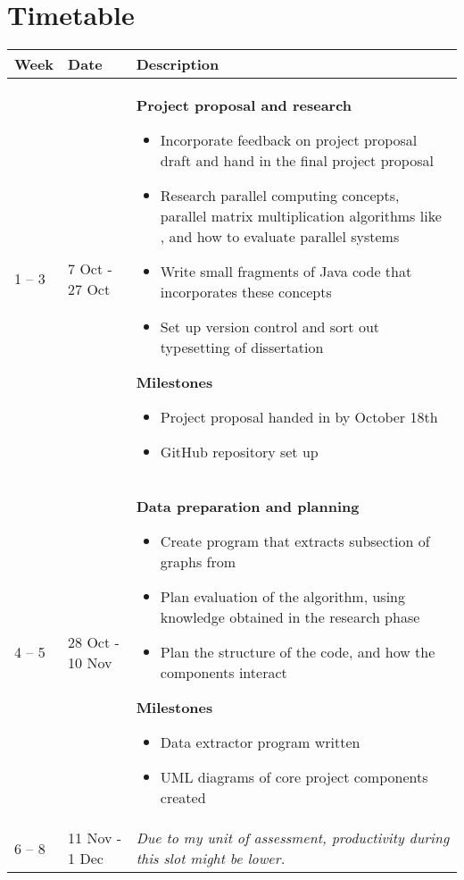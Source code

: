 \documentclass{article}
\begin{document}
\newpage

\section*{Timetable}%
\label{sec:Timetable}

\begin{longtable}{m{40pt}m{75pt}m{265pt}}
    \hline
    \hline
    \textbf{Week} & \textbf{Date} & \textbf{Description} \\
    \hline
    1 -- 3 & 7 Oct - 27 Oct & %
    \textbf{Project proposal and research}
    \begin{itemize}
        \item Incorporate feedback on project proposal draft and hand in the
            final project proposal
        \item Research parallel computing concepts, parallel matrix
            multiplication algorithms like \cite{fox, cannon}, and how to evaluate
            parallel systems
        \item Write small fragments of Java code that incorporates these concepts
        \item Set up version control and sort out typesetting of dissertation
    \end{itemize}
    \textbf{Milestones}
    \begin{itemize}
        \item Project proposal handed in by October 18th
        \item GitHub repository set up
    \end{itemize} \\
    \hline
    4 -- 5 & 28 Oct - 10 Nov & %
    \textbf{Data preparation and planning}
    \begin{itemize}
        \item Create program that extracts subsection of graphs from \cite{road-data}
        \item Plan evaluation of the algorithm, using knowledge obtained in the research
            phase
        \item Plan the structure of the code, and how the components interact
    \end{itemize}
    \textbf{Milestones}
    \begin{itemize}
        \item Data extractor program written
        \item UML diagrams of core project components created
    \end{itemize} \\
    \hline
    6 -- 8 & 11 Nov - 1 Dec & %
    \textit{Due to my unit of assessment, productivity during this slot might be lower.}


\end{longtable}
\end{document}
